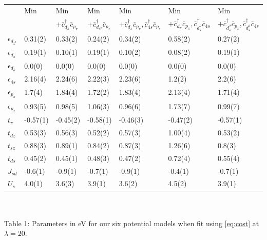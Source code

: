 \documentclass{article}
\begin{document}
\begin{table}[H]
\begin{center}

\begin{tabular}{l|llllll}
&Min & Min & Min & Min & Min & Min \\
& & $ + \bar{c}_{d_\pi}^\dagger \bar{c}_{p_\pi}$ & $ + \bar{c}_{d_{z^2}}^\dagger \bar{c}_{p_z}$ & $ + \bar{c}_{d_\pi}^\dagger \bar{c}_{p_\pi}, \bar{c}_{4s}^\dagger \bar{c}_{p_z}$ & $ + \bar{c}_{d_\pi}^\dagger \bar{c}_{p_\pi}, \bar{c}_{d_z^2}^\dagger \bar{c}_{4s}$ & $ + \bar{c}_{d_z^2}^\dagger \bar{c}_{p_z}, \bar{c}_{d_z^2}^\dagger \bar{c}_{4s}$ \\ \hline 
$\epsilon_{d_{z^2}}$& 0.31(2)& 0.33(2)& 0.24(2)& 0.34(2)& 0.58(2)& 0.27(2)\\
$\epsilon_{d_\pi}$& 0.19(1)& 0.10(1)& 0.19(1)& 0.10(2)& 0.08(2)& 0.19(1)\\
$\epsilon_{d_\delta}$& 0.0(0)& 0.0(0)& 0.0(0)& 0.0(0)& 0.0(0)& 0.0(0)\\
$\epsilon_{4s}$& 2.16(4)& 2.24(6)& 2.22(3)& 2.23(6)& 1.2(2)& 2.2(6)\\
$\epsilon_{p_\pi}$& 1.7(4)& 1.84(4)& 1.72(2)& 1.83(4)& 2.13(4)& 1.71(4)\\
$\epsilon_{p_z}$& 0.93(5)& 0.98(5)& 1.06(3)& 0.96(6)& 1.73(7)& 0.99(7)\\
$t_\pi$& -0.57(1)& -0.45(2)& -0.58(1)& -0.46(3)& -0.47(2)& -0.57(1)\\
$t_{dz}$& 0.53(3)& 0.56(3)& 0.52(2)& 0.57(3)& 1.00(4)& 0.53(2)\\
$t_{sz}$& 0.88(3)& 0.89(1)& 0.84(2)& 0.87(3)& 1.26(6)& 0.8(3)\\
$t_{ds}$& 0.45(2)& 0.45(1)& 0.48(3)& 0.47(2)& 0.72(4)& 0.55(4)\\
$J_{sd}$& -0.6(1)& -0.9(1)& -0.7(1)& -0.9(1)& -0.4(1)& -0.7(1)\\
$U_s$& 4.0(1)& 3.6(3)& 3.9(1)& 3.6(2)& 4.5(2)& 3.9(1)\\
\end{tabular}
\\ $\ $
\\
Table 1: Parameters in eV for our six potential models when fit using \eqref{eq:cost} at $\lambda = 20$. 
\end{center}
\end{table}
\end{document}

